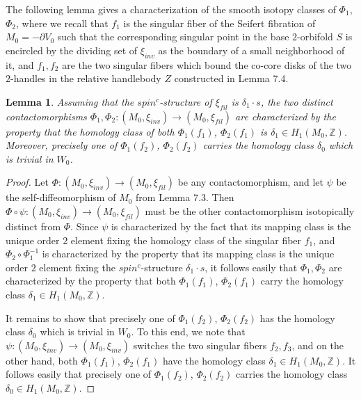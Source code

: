 \documentclass[11pt]{amsart}
\theoremstyle{plain}
\numberwithin{theorem}{section}
\newtheorem{lemma}[theorem]{Lemma}
\theoremstyle{definition}
\newcommand{\Z}{{\mathbb Z}}
\begin{document}
The following lemma gives a characterization of the smooth isotopy classes of $\Phi_1$, $\Phi_2$, where we recall that $f_1$ is the singular fiber of the Seifert fibration of $M_0=-\partial V_0$ such that the corresponding singular point in the base $2$-orbifold $S$ is encircled by the dividing set of 
$\xi_{inv}$ as the boundary of a small neighborhood of it, and $f_1,f_2$ are the two singular fibers which bound the co-core disks of the two $2$-handles in the relative handlebody $Z$ constructed in
Lemma 7.4. 

\begin{lemma}
Assuming that the $spin^c$-structure of $\xi_{fil}$ is $\delta_1\cdot s$, the two distinct contactomorphisms $\Phi_1,\Phi_2: (M_0,\xi_{inv})\rightarrow (M_0,\xi_{fil})$ are characterized 
by the property that the homology class of both $\Phi_1(f_1)$, $\Phi_2(f_1)$ is 
$\delta_1\in H_1(M_0,\Z)$. Moreover, precisely one of $\Phi_1(f_2)$, $\Phi_2(f_2)$ carries the homology 
class $\delta_0$ which is trivial in $W_0$. 
\end{lemma}

\begin{proof} 
Let $\Phi:(M_0,\xi_{inv})\rightarrow (M_0,\xi_{fil})$ be any contactomorphism, and let $\psi$ be the self-diffeomorphism of $M_0$ from Lemma 7.3. Then $\Phi\circ\psi: (M_0,\xi_{inv}) \rightarrow (M_0,\xi_{fil})$ must be the other contactomorphism isotopically distinct from $\Phi$. 
Since $\psi$ is characterized by the fact that its
mapping class is the unique order $2$ element fixing the homology class of the singular fiber $f_1$,
and $\Phi_2\circ \Phi_1^{-1}$ is characterized by the property that its mapping class is the unique 
order $2$ element fixing the $spin^c$-structure $\delta_1\cdot s$, it follows easily that 
$\Phi_1,\Phi_2$ are characterized by the property that both $\Phi_1(f_1)$, $\Phi_2(f_1)$ carry the homology class
$\delta_1\in H_1(M_0,\Z)$. 

It remains to show that precisely one of $\Phi_1(f_2)$, $\Phi_2(f_2)$ has the homology class 
$\delta_0$ which is trivial in $W_0$. To this end, we note that $\psi: (M_0,\xi_{inv})\rightarrow (M_0,\xi_{inv})$ switches the two singular fibers $f_2,f_3$, and on the other hand, both $\Phi_1(f_1)$, $\Phi_2(f_1)$ have the homology class $\delta_1\in H_1(M_0,\Z)$. It follows easily that precisely one of $\Phi_1(f_2)$, $\Phi_2(f_2)$ 
carries the homology class $\delta_0\in H_1(M_0,\Z)$.

\end{proof}
\end{document}
